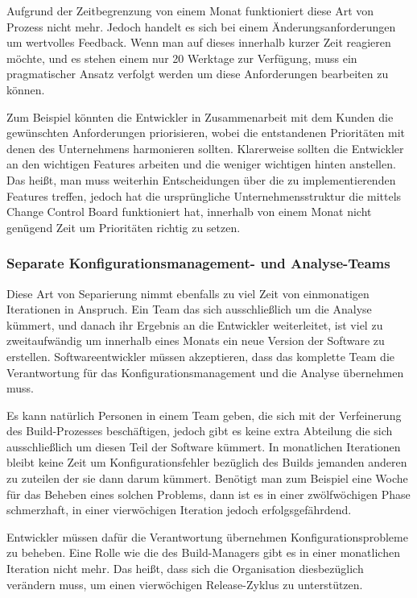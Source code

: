 Aufgrund der Zeitbegrenzung von einem Monat funktioniert diese Art von Prozess nicht mehr. Jedoch handelt es sich bei einem Änderungsanforderungen um wertvolles Feedback. Wenn man auf dieses innerhalb kurzer Zeit reagieren möchte, und es stehen einem nur 20 Werktage zur Verfügung, muss ein pragmatischer Ansatz verfolgt werden um diese Anforderungen bearbeiten zu können. 

Zum Beispiel könnten die Entwickler in Zusammenarbeit mit dem Kunden die gewünschten Anforderungen priorisieren, wobei die entstandenen Prioritäten mit denen des Unternehmens harmonieren sollten. Klarerweise sollten die Entwickler an den wichtigen Features arbeiten und die weniger wichtigen hinten anstellen. Das heißt, man muss weiterhin Entscheidungen über die zu implementierenden Features treffen, jedoch hat die ursprüngliche Unternehmensstruktur die mittels Change Control Board funktioniert hat, innerhalb von einem Monat nicht genügend Zeit um Prioritäten richtig zu setzen.

\subsubsection{Separate Konfigurationsmanagement- und Analyse-Teams}
Diese Art von Separierung nimmt ebenfalls zu viel Zeit von einmonatigen Iterationen in Anspruch. Ein Team das sich ausschließlich um die Analyse kümmert, und danach ihr Ergebnis an die Entwickler weiterleitet, ist viel zu zweitaufwändig um innerhalb eines Monats ein neue Version der Software zu erstellen. Softwareentwickler müssen akzeptieren, dass das komplette Team die Verantwortung für das Konfigurationsmanagement und die Analyse übernehmen muss.

Es kann natürlich Personen in einem Team geben, die sich mit der Verfeinerung des Build-Prozesses beschäftigen, jedoch gibt es keine extra Abteilung die sich ausschließlich um diesen Teil der Software kümmert. In monatlichen Iterationen bleibt keine Zeit um Konfigurationsfehler bezüglich des Builds jemanden anderen zu zuteilen der sie dann darum kümmert. Benötigt man zum Beispiel eine Woche für das Beheben eines solchen Problems, dann ist es in einer zwölfwöchigen Phase schmerzhaft, in einer vierwöchigen Iteration jedoch erfolgsgefährdend. 

Entwickler müssen dafür die Verantwortung übernehmen Konfigurationsprobleme zu beheben. Eine Rolle wie die des Build-Managers gibt es in einer monatlichen Iteration nicht mehr. Das heißt, dass sich die Organisation diesbezüglich verändern muss, um einen vierwöchigen Release-Zyklus zu unterstützen.
